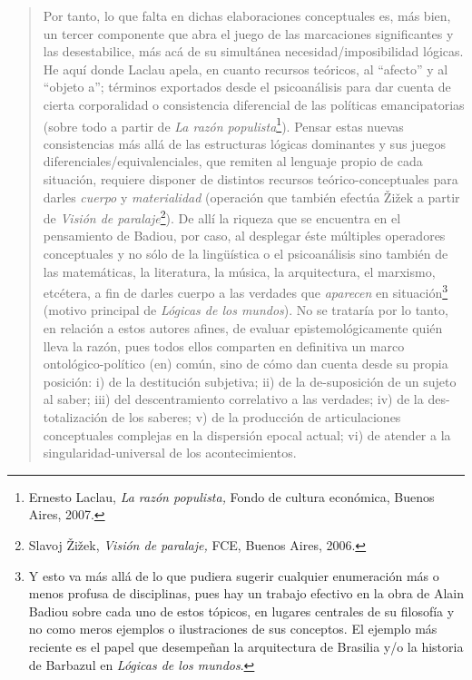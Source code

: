 \begin{quote}
Por tanto, lo que falta en dichas elaboraciones conceptuales es, más bien, un tercer componente que abra el juego de las marcaciones significantes y las desestabilice, más acá de su simultánea necesidad/imposibilidad lógicas. He aquí donde Laclau apela, en cuanto recursos teóricos, al \enquote{afecto} y al \enquote{objeto a}; términos exportados desde el psicoanálisis para dar cuenta de cierta corporalidad o consistencia diferencial de las políticas emancipatorias (sobre todo a partir de \emph{La razón populista}\footnote{Ernesto Laclau, \emph{La razón populista,} Fondo de cultura económica, Buenos Aires, 2007.}). Pensar estas nuevas consistencias más allá de las estructuras lógicas dominantes y sus juegos diferenciales/equivalenciales, que remiten al lenguaje propio de cada situación, requiere disponer de distintos recursos teórico-conceptuales para darles \emph{cuerpo} y \emph{materialidad} (operación que también efectúa Žižek a partir de \emph{Visión de paralaje}\footnote{Slavoj Žižek, \emph{Visión de paralaje,} FCE, Buenos Aires, 2006.}). De allí la riqueza que se encuentra en el pensamiento de Badiou, por caso, al desplegar éste múltiples operadores conceptuales y no sólo de la lingüística o el psicoanálisis sino también de las matemáticas, la literatura, la música, la arquitectura, el marxismo, etcétera, a fin de darles cuerpo a las verdades que \emph{aparecen} en situación\footnote{Y esto va más allá de lo que pudiera sugerir cualquier enumeración más o menos profusa de disciplinas, pues hay un trabajo efectivo en la obra de Alain Badiou sobre cada uno de estos tópicos, en lugares centrales de su filosofía y no como meros ejemplos o ilustraciones de sus conceptos. El ejemplo más reciente es el papel que desempeñan la arquitectura de Brasilia y/o la historia de Barbazul  en \emph{Lógicas de los mundos}.} (motivo principal de \emph{Lógicas de los mundos}). No se trataría por lo tanto, en relación a estos autores afines, de evaluar epistemológicamente quién lleva la razón, pues todos ellos comparten en definitiva un marco ontológico-político (en) común, sino de cómo dan cuenta desde su propia posición: i) de la destitución subjetiva; ii) de la de-suposición de un sujeto al saber; iii) del descentramiento correlativo a las verdades; iv) de la des-totalización de los saberes; v) de la producción de articulaciones conceptuales complejas en la dispersión epocal actual; vi) de atender a la singularidad-universal de los acontecimientos.


\end{quote}
